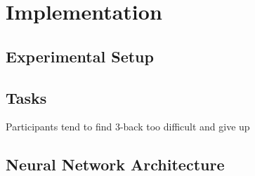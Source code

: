 \chapter{Implementation} \label{sec:impl}

\section{Experimental Setup}
\section{Tasks} \label{sec:impl/tasks}

Participants tend to find 3-back too difficult and give up \cite{ayaz2007, izzetoglu2007}

\section{Neural Network Architecture}